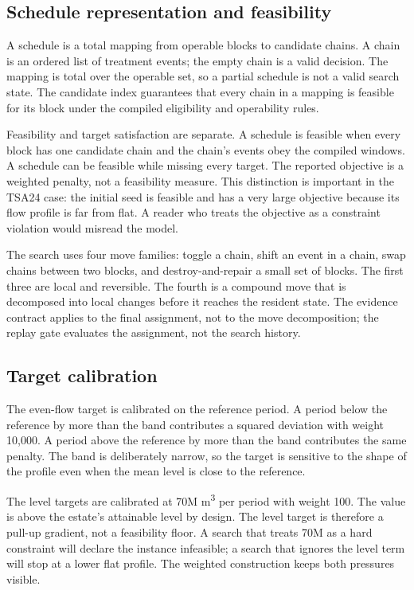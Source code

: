 \documentclass[preprint,11pt]{elsarticle}
\begin{document}
\subsection{Schedule representation and feasibility}

A schedule is a total mapping from operable blocks to candidate chains. A chain is an ordered list of
treatment events; the empty chain is a valid decision. The mapping is total over the operable set, so
a partial schedule is not a valid search state. The candidate index guarantees that every chain in a
mapping is feasible for its block under the compiled eligibility and operability rules.

Feasibility and target satisfaction are separate. A schedule is feasible when every block has one
candidate chain and the chain's events obey the compiled windows. A schedule can be feasible while
missing every target. The reported objective is a weighted penalty, not a feasibility measure. This
distinction is important in the TSA24 case: the initial seed is feasible and has a very large
objective because its flow profile is far from flat. A reader who treats the objective as a
constraint violation would misread the model.

The search uses four move families: toggle a chain, shift an event in a chain, swap chains between
two blocks, and destroy-and-repair a small set of blocks. The first three are local and reversible.
The fourth is a compound move that is decomposed into local changes before it reaches the resident
state. The evidence contract applies to the final assignment, not to the move decomposition; the
replay gate evaluates the assignment, not the search history.

\subsection{Target calibration}

The even-flow target is calibrated on the reference period. A period below the reference by more than
the band contributes a squared deviation with weight 10,000. A period above the reference by more
than the band contributes the same penalty. The band is deliberately narrow, so the target is
sensitive to the shape of the profile even when the mean level is close to the reference.

The level targets are calibrated at 70M m\textsuperscript{3} per period with weight 100. The value is
above the estate's attainable level by design. The level target is therefore a pull-up gradient, not
a feasibility floor. A search that treats 70M as a hard constraint will declare the instance
infeasible; a search that ignores the level term will stop at a lower flat profile. The weighted
construction keeps both pressures visible.
\end{document}
